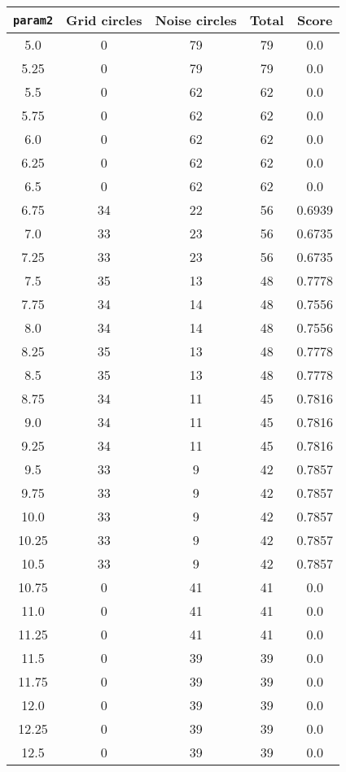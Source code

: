 \documentclass[letterpaper, 12pt]{article}
\begin{document}
\begin{longtable}{|c|c|c|c|c|}
\hline
\textbf{\texttt{param2}} & \textbf{Grid circles} & \textbf{Noise circles} & \textbf{Total} & \textbf{Score} \\
\hline
5.0 & 0 & 79 & 79 & 0.0 \\
\hline
5.25 & 0 & 79 & 79 & 0.0 \\
\hline
5.5 & 0 & 62 & 62 & 0.0 \\
\hline
5.75 & 0 & 62 & 62 & 0.0 \\
\hline
6.0 & 0 & 62 & 62 & 0.0 \\
\hline
6.25 & 0 & 62 & 62 & 0.0 \\
\hline
6.5 & 0 & 62 & 62 & 0.0 \\
\hline
6.75 & 34 & 22 & 56 & 0.6939 \\
\hline
7.0 & 33 & 23 & 56 & 0.6735 \\
\hline
7.25 & 33 & 23 & 56 & 0.6735 \\
\hline
7.5 & 35 & 13 & 48 & 0.7778 \\
\hline
7.75 & 34 & 14 & 48 & 0.7556 \\
\hline
8.0 & 34 & 14 & 48 & 0.7556 \\
\hline
8.25 & 35 & 13 & 48 & 0.7778 \\
\hline
8.5 & 35 & 13 & 48 & 0.7778 \\
\hline
8.75 & 34 & 11 & 45 & 0.7816 \\
\hline
9.0 & 34 & 11 & 45 & 0.7816 \\
\hline
9.25 & 34 & 11 & 45 & 0.7816 \\
\hline
9.5 & 33 & 9 & 42 & 0.7857 \\
\hline
9.75 & 33 & 9 & 42 & 0.7857 \\
\hline
10.0 & 33 & 9 & 42 & 0.7857 \\
\hline
10.25 & 33 & 9 & 42 & 0.7857 \\
\hline
10.5 & 33 & 9 & 42 & 0.7857 \\
\hline
10.75 & 0 & 41 & 41 & 0.0 \\
\hline
11.0 & 0 & 41 & 41 & 0.0 \\
\hline
11.25 & 0 & 41 & 41 & 0.0 \\
\hline
11.5 & 0 & 39 & 39 & 0.0 \\
\hline
11.75 & 0 & 39 & 39 & 0.0 \\
\hline
12.0 & 0 & 39 & 39 & 0.0 \\
\hline
12.25 & 0 & 39 & 39 & 0.0 \\
\hline
12.5 & 0 & 39 & 39 & 0.0 \\

\end{longtable}
\end{document}
